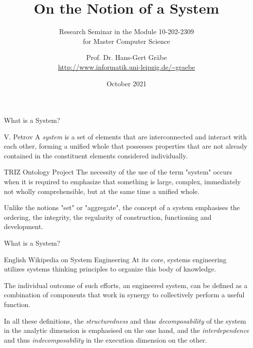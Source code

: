 \documentclass{beamer}
\title{On the Notion of a System}
\subtitle{Research Seminar in the Module 10-202-2309\\ for Master Computer
  Science}
\author{Prof. Dr. Hans-Gert Gräbe\\
\url{http://www.informatik.uni-leipzig.de/~graebe}}
\date{October 2021}
\begin{document}
{
\begin{frame}
  \titlepage
\end{frame}}

\begin{frame}{What is a System?}
  \begin{block}{V. Petrov}
    A \emph{system} is a set of elements that are interconnected and interact
    with each other, forming a unified whole that possesses properties that
    are not already contained in the constituent elements considered
    individually.
  \end{block}

  \begin{block}{TRIZ Ontology Project}
    The necessity of the use of the term "system" occurs when it is required to
    emphasize that something is large, complex, immediately not wholly
    comprehensible, but at the same time a unified whole.

    Unlike the notions "set" or "aggregate", the concept of a system emphasises
    the ordering, the integrity, the regularity of construction, functioning and
    development. 
  \end{block}
\end{frame}

\begin{frame}{What is a System?}
  \begin{block}{English Wikipedia on System Engineering}
    At its core, systems engineering utilizes systems thinking principles to
    organize this body of knowledge.

    The individual outcome of such efforts, an engineered system, can be defined
    as a combination of components that work in synergy to collectively perform
    a useful function. 
  \end{block}
  
In all these definitions, the \emph{structuredness} and thus
\emph{decomposability} of the system in the analytic dimension is emphasised
on the one hand, and the \emph{interdependence} and thus
\emph{indecomposability} in the execution dimension on the other.

\end{frame}
\end{document}

